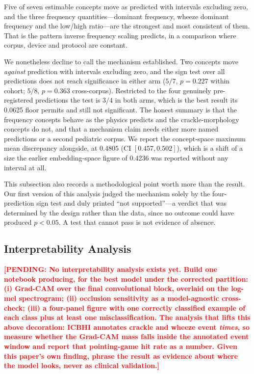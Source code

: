 \documentclass[journal,onecolumn]{IEEEtran}
\newcommand{\pending}[1]{\textcolor{red}{\textbf{[PENDING: #1]}}}
\begin{document}
Five of seven estimable concepts move as predicted with intervals excluding zero, and
the three frequency quantities---dominant frequency, wheeze dominant frequency and the
low/high ratio---are the strongest and most consistent of them. That is the pattern
inverse frequency scaling predicts, in a comparison where corpus, device and protocol
are constant.

We nonetheless decline to call the mechanism established. Two concepts move
\emph{against} prediction with intervals excluding zero, and the sign test over all
predictions does not reach significance in either arm ($5/7$, $p=0.227$ within cohort;
$5/8$, $p=0.363$ cross-corpus). Restricted to the four genuinely pre-registered
predictions the test is $3/4$ in both arms, which is the best result its 0.0625 floor
permits and still not significant. The honest summary is that the frequency concepts
behave as the physics predicts and the crackle-morphology concepts do not, and that a
mechanism claim needs either more named predictions or a second pediatric corpus. We
report the concept-space maximum mean discrepancy alongside, at $0.4805$ (CI
$[0.457, 0.502]$), which is a shift of a size the earlier embedding-space figure of
0.4236 was reported without any interval at all.

This subsection also records a methodological point worth more than the result. Our
first version of this analysis judged the mechanism solely by the four-prediction sign
test and duly printed ``not supported''---a verdict that was determined by the design
rather than the data, since no outcome could have produced $p<0.05$. A test that cannot
pass is not evidence of absence.

\subsection{Interpretability Analysis}
\label{subsec:xai}

\pending{No interpretability analysis exists yet. Build one notebook producing, for
the best model under the corrected partition: (i) Grad-CAM over the final
convolutional block, overlaid on the log-mel spectrogram; (ii) occlusion sensitivity
as a model-agnostic cross-check; (iii) a four-panel figure with one correctly
classified example of each class plus at least one misclassification. The analysis
that lifts this above decoration: ICBHI annotates crackle and wheeze event
\emph{times}, so measure whether the Grad-CAM mass falls inside the annotated event
window and report that pointing-game hit rate as a number. Given this paper's own
finding, phrase the result as evidence about where the model looks, never as clinical
validation.}
\end{document}
